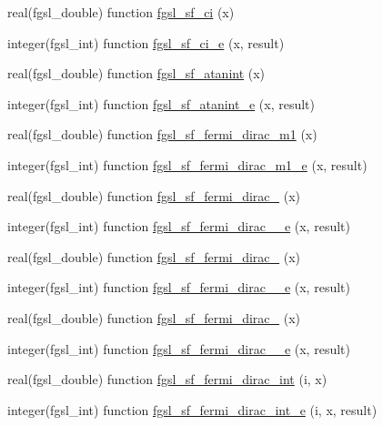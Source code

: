 \begin{DoxyCompactItemize}
\item 
real(fgsl\+\_\+double) function \hyperlink{specfunc_8finc_af37d91f8a5f87d50df39eb28669792a1}{fgsl\+\_\+sf\+\_\+ci} (x)
\item 
integer(fgsl\+\_\+int) function \hyperlink{specfunc_8finc_a60780872ace717f6d08ba8818deafd29}{fgsl\+\_\+sf\+\_\+ci\+\_\+e} (x, result)
\item 
real(fgsl\+\_\+double) function \hyperlink{specfunc_8finc_aea59dd2be70a210689b1d8c72fe0c188}{fgsl\+\_\+sf\+\_\+atanint} (x)
\item 
integer(fgsl\+\_\+int) function \hyperlink{specfunc_8finc_a50b0fa2ad22bafa445a01572532bef66}{fgsl\+\_\+sf\+\_\+atanint\+\_\+e} (x, result)
\item 
real(fgsl\+\_\+double) function \hyperlink{specfunc_8finc_a93a0202e4ca9ec26774efcda9cba3d9e}{fgsl\+\_\+sf\+\_\+fermi\+\_\+dirac\+\_\+m1} (x)
\item 
integer(fgsl\+\_\+int) function \hyperlink{specfunc_8finc_a2634cfd8188ced8da822511514bea417}{fgsl\+\_\+sf\+\_\+fermi\+\_\+dirac\+\_\+m1\+\_\+e} (x, result)
\item 
real(fgsl\+\_\+double) function \hyperlink{specfunc_8finc_a45b38529fa2fd7f50dca41709c8414fc}{fgsl\+\_\+sf\+\_\+fermi\+\_\+dirac\+\_} (x)
\item 
integer(fgsl\+\_\+int) function \hyperlink{specfunc_8finc_a17a9fa088836577a44dd0b3dacbf15d9}{fgsl\+\_\+sf\+\_\+fermi\+\_\+dirac\+\_\+\_\+e} (x, result)
\item 
real(fgsl\+\_\+double) function \hyperlink{specfunc_8finc_a109ba391d8bb217c69c866f3955db733}{fgsl\+\_\+sf\+\_\+fermi\+\_\+dirac\+\_} (x)
\item 
integer(fgsl\+\_\+int) function \hyperlink{specfunc_8finc_adaaba19e458a726cbafc839539cf2045}{fgsl\+\_\+sf\+\_\+fermi\+\_\+dirac\+\_\+\_\+e} (x, result)
\item 
real(fgsl\+\_\+double) function \hyperlink{specfunc_8finc_a80eb8b1b52f1a43af6c7ff6069d6c8e9}{fgsl\+\_\+sf\+\_\+fermi\+\_\+dirac\+\_} (x)
\item 
integer(fgsl\+\_\+int) function \hyperlink{specfunc_8finc_aba4378d6806c9ae250445d8c75df96e7}{fgsl\+\_\+sf\+\_\+fermi\+\_\+dirac\+\_\+\_\+e} (x, result)
\item 
real(fgsl\+\_\+double) function \hyperlink{specfunc_8finc_ad2208724ae514764c396eac76762b470}{fgsl\+\_\+sf\+\_\+fermi\+\_\+dirac\+\_\+int} (i, x)
\item 
integer(fgsl\+\_\+int) function \hyperlink{specfunc_8finc_a31ba435ef71d98ce1d0f9fff5489e146}{fgsl\+\_\+sf\+\_\+fermi\+\_\+dirac\+\_\+int\+\_\+e} (i, x, result)

\end{DoxyCompactItemize}
